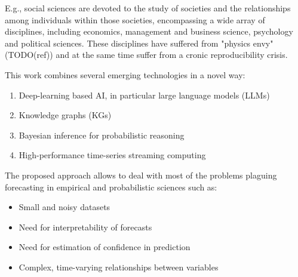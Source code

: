\documentclass[11pt, reqno]{amsart}
\theoremstyle{definition}
\theoremstyle{remark}
\begin{document}
  E.g., social sciences are devoted to the study of societies and the
  relationships among individuals within those societies, encompassing a wide
  array of disciplines, including economics, management and business science,
  psychology and political sciences. These disciplines have suffered from
  "physics envy" (TODO(ref)) and at the same time suffer from a cronic
  reproducibility crisis.


  This work combines several emerging technologies in a novel way:
  \begin{enumerate}
    \item Deep-learning based AI, in particular large language models (LLMs)

    \item Knowledge graphs (KGs)

    \item Bayesian inference for probabilistic reasoning

    \item High-performance time-series streaming computing
  \end{enumerate}

  The proposed approach allows to deal with most of the problems plaguing
  forecasting in empirical and probabilistic sciences such as:
  \begin{itemize}
    \item Small and noisy datasets

    \item Need for interpretability of forecasts

    \item Need for estimation of confidence in prediction

    \item Complex, time-varying relationships between variables
  \end{itemize}
\end{document}

